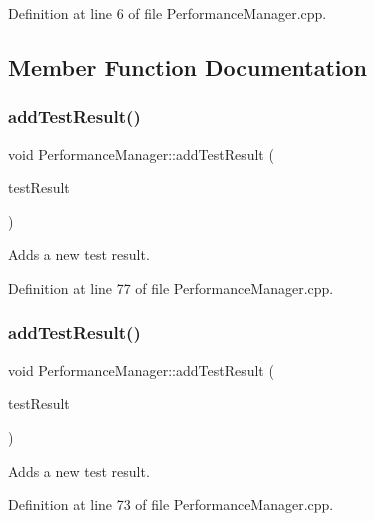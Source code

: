 Definition at line 6 of file Performance\+Manager.\+cpp.



\subsection{Member Function Documentation}
\mbox{\label{class_performance_manager_a35c9c4d3c52d3580a56a684196393dd5}} 
\subsubsection{\texorpdfstring{add\+Test\+Result()}{addTestResult()}\hspace{0.1cm}{\footnotesize\ttfamily [1/2]}}
{\footnotesize\ttfamily void Performance\+Manager\+::add\+Test\+Result (\begin{DoxyParamCaption}\item[{\hyperlink{class_test_result}{Test\+Result} $\ast$}]{test\+Result }\end{DoxyParamCaption})}

Adds a new test result. 

Definition at line 77 of file Performance\+Manager.\+cpp.

\mbox{\label{class_performance_manager_a732f26520dd9d6216b7ac80160bc5db3}} 
\subsubsection{\texorpdfstring{add\+Test\+Result()}{addTestResult()}\hspace{0.1cm}{\footnotesize\ttfamily [2/2]}}
{\footnotesize\ttfamily void Performance\+Manager\+::add\+Test\+Result (\begin{DoxyParamCaption}\item[{\hyperlink{class_test_result}{Test\+Result} \&}]{test\+Result }\end{DoxyParamCaption})}

Adds a new test result. 

Definition at line 73 of file Performance\+Manager.\+cpp.

